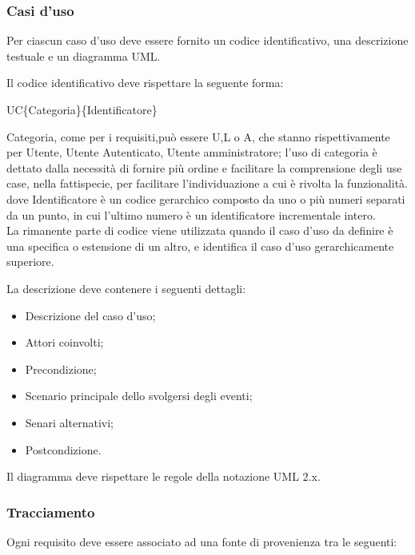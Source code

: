 \subsubsection{Casi d'uso}
Per ciascun caso d'uso deve essere fornito un codice identificativo, una descrizione testuale e un diagramma UML.

\begin{flushleft}
Il codice identificativo deve rispettare la seguente forma:
\end{flushleft}

\begin{center}UC\{Categoria\}\{Identificatore\}\end{center}
Categoria, come per i requisiti,può essere U,L o A, che stanno rispettivamente per Utente, Utente Autenticato, Utente amministratore; l'uso di categoria è dettato dalla necessità di fornire più ordine e facilitare la comprensione degli use case, nella fattispecie, per facilitare l'individuazione a cui è rivolta la funzionalità.
dove Identificatore è un codice gerarchico composto da uno o più numeri separati da un punto, in cui l'ultimo numero è un identificatore incrementale intero.\\
La rimanente parte di codice viene utilizzata quando il caso d'uso da definire è una specifica o estensione di un altro, e identifica il caso d'uso gerarchicamente superiore.

\begin{flushleft}
La descrizione deve contenere i seguenti dettagli:
\end{flushleft}

\begin{itemize}
\item Descrizione del caso d'uso;
\item Attori coinvolti;
\item Precondizione;
\item Scenario principale dello svolgersi degli eventi;
\item Senari alternativi;
\item Postcondizione.
\end{itemize}

\begin{flushleft}
Il diagramma deve rispettare le regole della notazione UML 2.x.
\end{flushleft}

\subsubsection{Tracciamento}
Ogni requisito deve essere associato ad una fonte di provenienza tra le seguenti:

